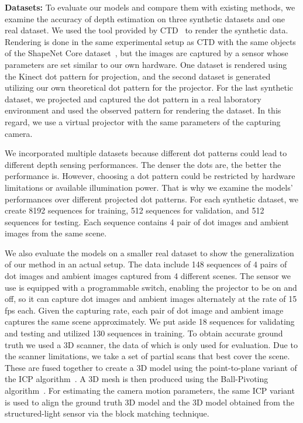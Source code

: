 \noindent\textbf{Datasets:} To evaluate our models and compare them with existing methods, we examine the accuracy of depth estimation on three synthetic datasets and one real dataset. We used the tool provided by CTD~\cite{riegler2019connecting} to render the synthetic data. Rendering is done in the same experimental setup as CTD with the same objects of the ShapeNet Core dataset~\cite{chang2015shapenet}, but the images are captured by a sensor whose parameters are set similar to our own hardware. One dataset is rendered using the Kinect dot pattern for projection, and the second dataset is generated utilizing our own theoretical dot pattern for the projector. For the last synthetic dataset, we projected and captured the dot pattern in a real laboratory environment and used the observed pattern for rendering the dataset. In this regard, we use a virtual projector with the same parameters of the capturing camera.

We incorporated multiple datasets because different dot patterns could lead to different depth sensing performances. The denser the dots are, the better the performance is. However, choosing a dot pattern could be restricted by hardware limitations or available illumination power. That is why we examine the models' performances over different projected dot patterns. For each synthetic dataset, we create 8192 sequences for training, 512 sequences for validation, and 512 sequences for testing. Each sequence contains 4 pair of dot images and ambient images from the same scene.

We also evaluate the models on a smaller real dataset to show the generalization of our method in an actual setup. The data include 148 sequences of 4 pairs of dot images and ambient images captured from 4 different scenes. The sensor we use is equipped with a programmable switch, enabling the projector to be on and off, so it can capture dot images and ambient images alternately at the rate of 15 fps each. Given the capturing rate, each pair of dot image and ambient image captures the same scene approximately. We put aside 18 sequences for validating and testing and utilized 130 sequences in training. To obtain accurate ground truth we used a 3D scanner, the data of which is only used for evaluation. Due to the scanner limitations, we take a set of partial scans that best cover the scene. These are fused together to create a 3D model using the point-to-plane variant of the ICP algorithm~\cite{Chen1992ObjectMB}. A 3D mesh is then produced using the Ball-Pivoting algorithm~\cite{bernardini99ball}. For estimating the camera motion parameters, the same ICP variant is used to align the ground truth 3D model and the 3D model obtained from the structured-light sensor via the block matching technique.

